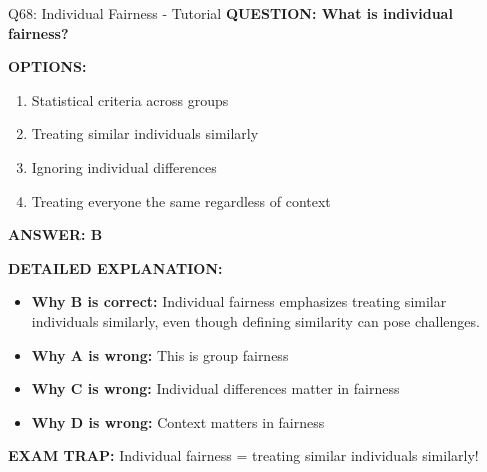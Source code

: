 \documentclass[8pt]{beamer}
\begin{document}
	\begin{frame}{Q68: Individual Fairness - Tutorial}
		\fontsize{6.5}{7.5}\selectfont
		\textbf{QUESTION: What is individual fairness?}
		
		\vspace{0.1cm}
		\textbf{OPTIONS:}
		\begin{enumerate}
			\item Statistical criteria across groups
			\item Treating similar individuals similarly
			\item Ignoring individual differences
			\item Treating everyone the same regardless of context
		\end{enumerate}
		
		\vspace{0.1cm}
		\textcolor{myblue}{\textbf{ANSWER: B}}
		
		\vspace{0.1cm}
		\textbf{DETAILED EXPLANATION:}
		\begin{itemize}
			\item \textbf{Why B is correct:} Individual fairness emphasizes treating similar individuals similarly, even though defining similarity can pose challenges.
			\item \textbf{Why A is wrong:} This is group fairness
			\item \textbf{Why C is wrong:} Individual differences matter in fairness
			\item \textbf{Why D is wrong:} Context matters in fairness
		\end{itemize}
		
		\textcolor{myred}{\textbf{EXAM TRAP:}} Individual fairness = \textcolor{myblue}{treating similar individuals similarly}!
	\end{frame}
	
\end{document}
